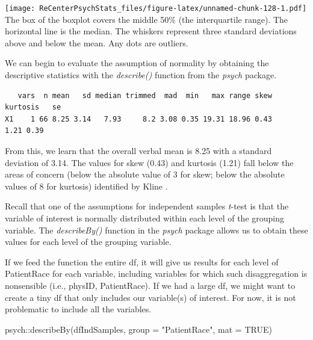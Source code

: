 \documentclass[
  11pt,
]{book}
\newenvironment{Shaded}{\begin{snugshade}}{\end{snugshade}}
\newcommand{\AttributeTok}[1]{\textcolor[rgb]{0.77,0.63,0.00}{#1}}
\newcommand{\ConstantTok}[1]{\textcolor[rgb]{0.00,0.00,0.00}{#1}}
\newcommand{\FunctionTok}[1]{\textcolor[rgb]{0.00,0.00,0.00}{#1}}
\newcommand{\NormalTok}[1]{#1}
\newcommand{\SpecialCharTok}[1]{\textcolor[rgb]{0.00,0.00,0.00}{#1}}
\newcommand{\StringTok}[1]{\textcolor[rgb]{0.31,0.60,0.02}{#1}}
\begin{document}
\texttt{[image: ReCenterPsychStats\_files/figure-latex/unnamed-chunk-128-1.pdf]}
The box of the boxplot covers the middle 50\% (the interquartile range). The horizontal line is the median. The whiskers represent three standard deviations above and below the mean. Any dots are outliers.

We can begin to evaluate the assumption of normality by obtaining the descriptive statistics with the \emph{describe()} function from the \emph{psych} package.

\begin{Shaded}
\end{Shaded}

\begin{verbatim}
   vars  n mean   sd median trimmed  mad  min   max range skew kurtosis   se
X1    1 66 8.25 3.14   7.93     8.2 3.08 0.35 19.31 18.96 0.43     1.21 0.39
\end{verbatim}

From this, we learn that the overall verbal mean is 8.25 with a standard deviation of 3.14. The values for skew (0.43) and kurtosis (1.21) fall below the areas of concern (below the absolute value of 3 for skew; below the absolute values of 8 for kurtosis) identified by Kline \citeyearpar{kline_principles_2016}.

Recall that one of the assumptions for independent samples \emph{t}-test is that the variable of interest is normally distributed within each level of the grouping variable. The \emph{describeBy()} function in the \emph{psych} package allows us to obtain these values for each level of the grouping variable.

If we feed the function the entire df, it will give us results for each level of PatientRace for each variable, including variables for which such disaggregation is nonsensible (i.e., physID, PatientRace). If we had a large df, we might want to create a tiny df that only includes our variable(s) of interest. For now, it is not problematic to include all the variables.

\begin{Shaded}
\begin{Highlighting}[]
\NormalTok{psych}\SpecialCharTok{::}\FunctionTok{describeBy}\NormalTok{(dfIndSamples, }\AttributeTok{group =} \StringTok{"PatientRace"}\NormalTok{, }\AttributeTok{mat =} \ConstantTok{TRUE}\NormalTok{)}
\end{Highlighting}
\end{Shaded}
\end{document}
